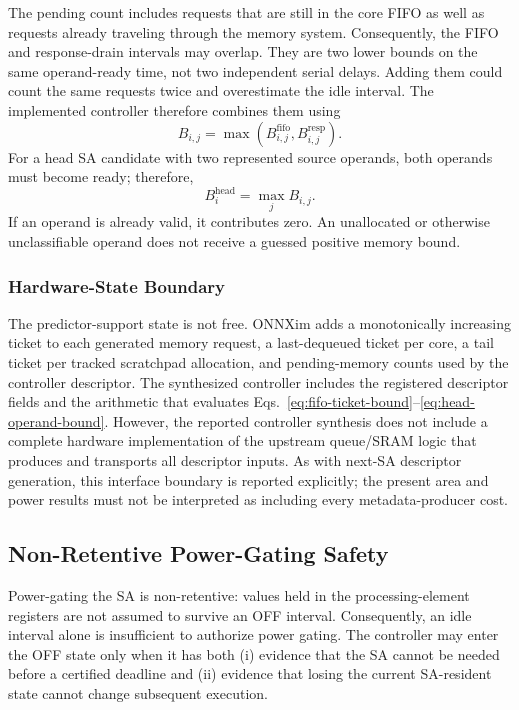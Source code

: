 The pending count includes requests that are still in the core FIFO as well
as requests already traveling through the memory system. Consequently, the
FIFO and response-drain intervals may overlap. They are two lower bounds on
the same operand-ready time, not two independent serial delays. Adding them
could count the same requests twice and overestimate the idle interval. The
implemented controller therefore combines them using
\begin{equation}
  B_{i,j}=\max\!\left(B^{\mathrm{fifo}}_{i,j},
                       B^{\mathrm{resp}}_{i,j}\right).
  \label{eq:memory-bound-max}
\end{equation}
For a head SA candidate with two represented source operands, both operands
must become ready; therefore,
\begin{equation}
  B^{\mathrm{head}}_i=\max_j B_{i,j}.
  \label{eq:head-operand-bound}
\end{equation}
If an operand is already valid, it contributes zero. An unallocated or
otherwise unclassifiable operand does not receive a guessed positive memory
bound.

\subsubsection{Hardware-State Boundary}

The predictor-support state is not free. ONNXim adds a monotonically
increasing ticket to each generated memory request, a last-dequeued ticket per
core, a tail ticket per tracked scratchpad allocation, and pending-memory
counts used by the controller descriptor. The synthesized controller includes
the registered descriptor fields and the arithmetic that evaluates
Eqs.~\ref{eq:fifo-ticket-bound}--\ref{eq:head-operand-bound}. However, the
reported controller synthesis does not include a complete hardware
implementation of the upstream queue/SRAM logic that produces and transports
all descriptor inputs. As with next-SA descriptor generation, this interface
boundary is reported explicitly; the present area and power results must not
be interpreted as including every metadata-producer cost.

\subsection{Non-Retentive Power-Gating Safety}
\label{sec:nonretentive-safety}

Power-gating the SA is non-retentive: values held in the processing-element
registers are not assumed to survive an OFF interval. Consequently, an idle
interval alone is insufficient to authorize power gating. The controller may
enter the OFF state only when it has both (i) evidence that the SA cannot be
needed before a certified deadline and (ii) evidence that losing the current
SA-resident state cannot change subsequent execution.

